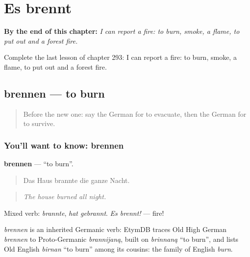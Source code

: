 
\chapter{Es brennt}
\label{ch:ge-es-brennt}

\begin{chapteropening}
\textbf{By the end of this chapter:} \emph{I can report a fire: to burn, smoke, a flame, to put out and a forest fire.}

Complete the last lesson of chapter 293: I can report a fire: to burn, smoke, a flame, to put out and a forest fire.
\end{chapteropening}

\section[brennen]{brennen — to burn}

\label{lesson:GE-C293-brennen}



\begin{quote}
Before the new one: say the German for to evacuate, then the German for to survive.
\end{quote}

\subsection*{You'll want to know: brennen}
\textbf{brennen} — \textquotedblleft{}to burn\textquotedblright{}.

\begin{quote}
Das Haus brannte die ganze Nacht.
\end{quote}

\begin{quote}
\emph{The house burned all night.}
\end{quote}

Mixed verb: \emph{brannte}, \emph{hat gebrannt}. \emph{Es brennt!} — fire!

\begin{cousinweb}
\emph{brennen} is an inherited Germanic verb: EtymDB traces Old High German \emph{brennen} to Proto-Germanic \emph{brannijaną}, built on \emph{brinnaną} \textquotedblleft{}to burn\textquotedblright{}, and lists Old English \emph{birnan} \textquotedblleft{}to burn\textquotedblright{} among its cousins: the family of English \emph{burn}.
\end{cousinweb}

